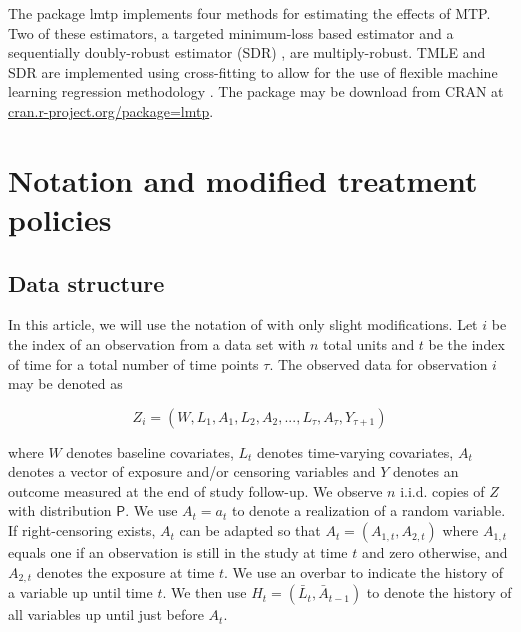 \documentclass[twoside,11pt]{article}
\newcommand{\Prob}{\mathsf{P}}
\begin{document}
The package lmtp implements four methods for estimating the effects of MTP. Two of these estimators, a targeted minimum-loss based estimator \citep{laanTargetedLearningCausal2011a, laanTargetedMaximumLikelihood2006} and a sequentially doubly-robust estimator (SDR) \citep{buckleyLinearRegressionCensored1979, fanCensoredRegressionLocal1994, vanderlaanUnifiedCrossValidationMethodology2003, rotnitzkyDoublyRobustEstimation2006, rubinDoublyRobustCensoring2006, kennedyNonparametricMethodsDoubly2017}, are multiply-robust. TMLE and SDR are implemented using cross-fitting to allow for the use of flexible machine learning regression methodology \citep{jasaLMTP}. The package may be download from CRAN at \url{cran.r-project.org/package=lmtp}.

\hypertarget{notation-and-modified-treatment-policies}{%
\section{Notation and modified treatment policies}\label{notation-and-modified-treatment-policies}}

\hypertarget{data-structure}{\subsection{Data structure}\label{data-structure}}

In this article, we will use the notation of \citet{jasaLMTP} with only slight modifications.  Let $i$ be the index of an observation from a data set with $n$ total units and $t$ be the index of time for a total number of time points $\tau$.  The observed data for observation $i$ may be denoted as

\begin{equation}
Z_i = (W, L_1, A_1, L_2, A_2, ..., L_{\tau}, A_{\tau}, Y_{\tau + 1})
\end{equation}

where $W$ denotes baseline covariates, $L_t$ denotes time-varying covariates, $A_t$ denotes a vector of exposure and/or censoring variables and $Y$ denotes an outcome measured at the end of study follow-up. We observe $n$ i.i.d. copies of $Z$ with distribution $\Prob$. We use $A_t = a_t$ to denote a realization of a random variable. If right-censoring exists, $A_t$ can be adapted so that $A_t = (A_{1, t}, A_{2, t})$ where $A_{1, t}$ equals one if an observation is still in the study at time $t$ and zero otherwise, and $A_{2, t}$ denotes the exposure at time $t$. We use an overbar to indicate the history of a variable up until time $t$. We then use $H_t = (\bar{L}_t, \bar{A}_{t-1})$ to denote the history of all variables up until just before $A_t$.
\end{document}
